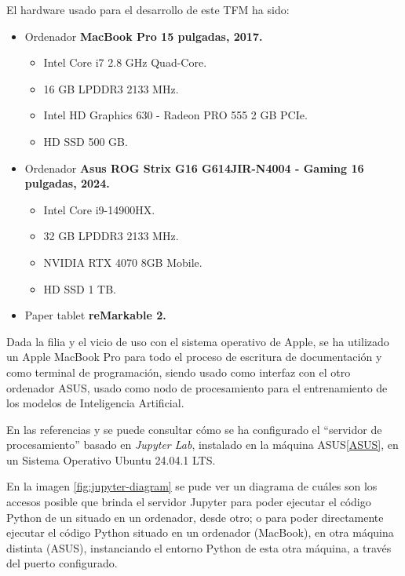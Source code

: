 El hardware usado para el desarrollo de este TFM ha sido:

\begin{itemize}
    \item Ordenador \textbf{MacBook Pro 15 pulgadas, 2017.}
    \begin{itemize}
        \item Intel Core i7 2.8 GHz Quad-Core.
        \item 16 GB LPDDR3 2133 MHz.
        \item Intel HD Graphics 630 - Radeon PRO 555 2 GB PCIe.
        \item HD SSD 500 GB.
    \end{itemize}
    \item Ordenador \textbf{Asus ROG Strix G16 G614JIR-N4004 - Gaming 16 pulgadas, 2024.}
    \label{ASUS}
    \begin{itemize}
        \item Intel Core i9-14900HX.
        \item 32 GB LPDDR3 2133 MHz.
        \item NVIDIA RTX 4070 8GB Mobile.
        \item HD SSD 1 TB.
    \end{itemize}
    \item Paper tablet \textbf{reMarkable 2.}
\end{itemize}

Dada la filia y el vicio de uso con el sistema operativo de Apple, se ha utilizado un Apple MacBook Pro para todo el proceso de escritura de documentación y como terminal de programación, siendo usado como interfaz con el otro ordenador ASUS, usado como nodo de procesamiento para el entrenamiento de los modelos de Inteligencia Artificial.

En las referencias \cite{geeksforgeeks2025jupyter} y \cite{vscode2025jupyter} se puede consultar cómo se ha configurado el ``servidor de procesamiento'' basado en \emph{Jupyter Lab}, instalado en la máquina ASUS\ref{ASUS}, en un Sistema Operativo Ubuntu 24.04.1 LTS.

En la imagen \ref{fig:jupyter-diagram} se pude ver un diagrama de cuáles son los accesos posible que brinda el servidor Jupyter para poder ejecutar el código Python de un situado en un ordenador, desde otro; o para poder directamente ejecutar el código Python situado en un ordenador (MacBook), en otra máquina distinta (ASUS), instanciando el entorno Python de esta otra máquina, a través del puerto configurado.

